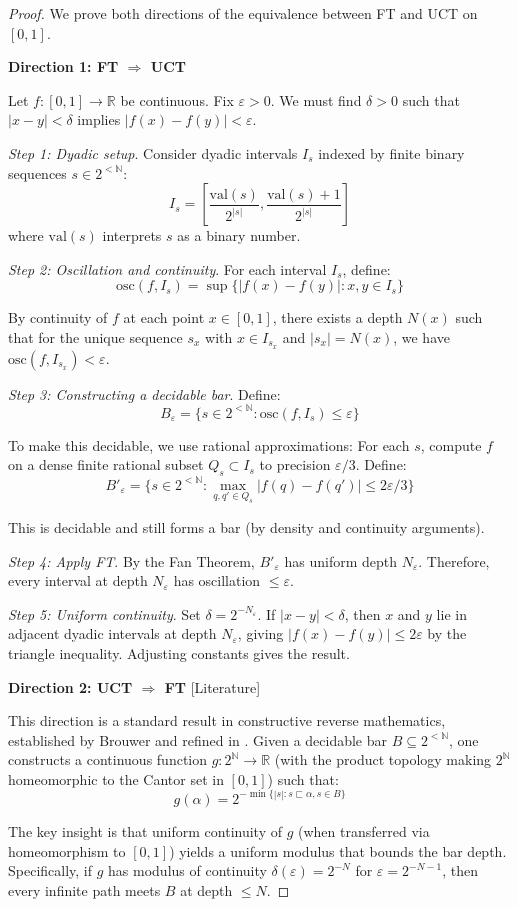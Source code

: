 \documentclass[11pt]{article}
\theoremstyle{plain}
\theoremstyle{definition}
\newcommand{\N}{\mathbb{N}}
\newcommand{\R}{\mathbb{R}}
\newcommand{\leancited}{\textsf{\textcolor{blue!70!black}{[Literature]}}}
\begin{document}
\begin{proof}
We prove both directions of the equivalence between FT and UCT on $[0,1]$.

\textbf{Direction 1: FT $\Rightarrow$ UCT}

Let $f: [0,1] \to \R$ be continuous. Fix $\varepsilon > 0$. We must find $\delta > 0$ such that $|x - y| < \delta$ implies $|f(x) - f(y)| < \varepsilon$.

\emph{Step 1: Dyadic setup}. Consider dyadic intervals $I_s$ indexed by finite binary sequences $s \in 2^{<\N}$:
\[
I_s = \left[\frac{\text{val}(s)}{2^{|s|}}, \frac{\text{val}(s) + 1}{2^{|s|}}\right]
\]
where $\text{val}(s)$ interprets $s$ as a binary number.

\emph{Step 2: Oscillation and continuity}. For each interval $I_s$, define:
\[
\text{osc}(f, I_s) = \sup\{|f(x) - f(y)| : x, y \in I_s\}
\]

By continuity of $f$ at each point $x \in [0,1]$, there exists a depth $N(x)$ such that for the unique sequence $s_x$ with $x \in I_{s_x}$ and $|s_x| = N(x)$, we have $\text{osc}(f, I_{s_x}) < \varepsilon$.

\emph{Step 3: Constructing a decidable bar}. Define:
\[
B_\varepsilon = \{s \in 2^{<\N} : \text{osc}(f, I_s) \leq \varepsilon\}
\]

To make this decidable, we use rational approximations: For each $s$, compute $f$ on a dense finite rational subset $Q_s \subset I_s$ to precision $\varepsilon/3$. Define:
\[
B'_\varepsilon = \{s \in 2^{<\N} : \max_{q, q' \in Q_s} |f(q) - f(q')| \leq 2\varepsilon/3\}
\]

This is decidable and still forms a bar (by density and continuity arguments).

\emph{Step 4: Apply FT}. By the Fan Theorem, $B'_\varepsilon$ has uniform depth $N_\varepsilon$. Therefore, every interval at depth $N_\varepsilon$ has oscillation $\leq \varepsilon$.

\emph{Step 5: Uniform continuity}. Set $\delta = 2^{-N_\varepsilon}$. If $|x - y| < \delta$, then $x$ and $y$ lie in adjacent dyadic intervals at depth $N_\varepsilon$, giving $|f(x) - f(y)| \leq 2\varepsilon$ by the triangle inequality. Adjusting constants gives the result.

\textbf{Direction 2: UCT $\Rightarrow$ FT} \leancited

This direction is a standard result in constructive reverse mathematics, established by Brouwer and refined in \cite{BridgesVita2006, TroelstraVanDalen1988}. Given a decidable bar $B \subseteq 2^{<\N}$, one constructs a continuous function $g: 2^\N \to \R$ (with the product topology making $2^\N$ homeomorphic to the Cantor set in $[0,1]$) such that:
\[
g(\alpha) = 2^{-\min\{|s| : s \sqsubset \alpha, s \in B\}}
\]

The key insight is that uniform continuity of $g$ (when transferred via homeomorphism to $[0,1]$) yields a uniform modulus that bounds the bar depth. Specifically, if $g$ has modulus of continuity $\delta(\varepsilon) = 2^{-N}$ for $\varepsilon = 2^{-N-1}$, then every infinite path meets $B$ at depth $\leq N$.
\end{proof}
\end{document}
